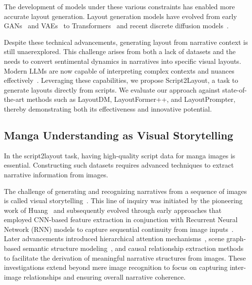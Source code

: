 \documentclass[sigconf, screen, review, anonymous]{acmart}
\begin{document}
The development of models under these various constraints has enabled more accurate layout generation.
Layout generation models have evolved from early GANs~\cite{li_layoutgan_2019} and VAEs~\cite{arroyo_variational_2021, jyothi2021layoutvaestochasticscenelayout} to Transformers~\cite{jiang_layoutformer_2023} and recent discrete diffusion models~\cite{inoue2023layoutdm, zhang_layoutdiffusion_2023}.

Despite these technical advancements, generating layout from narrative context is still unaerexplored. This challenge arises from both a lack of datasets and the needs to convert sentimental dynamics in narratives into specific visual layouts. Modern LLMs are now capable of interpreting complex contexts and nuances effectively~\cite{LLMunderstandingNarrative}. 
Leveraging these capabilities, we propose Script2Layout, a task to generate layouts directly from scripts. We evaluate our approach against state-of-the-art methods such as LayoutDM\cite{inoue2023layoutdm}, LayoutFormer++\cite{jiang_layoutformer_2023}, and LayoutPrompter\cite{lin_layoutprompter_2023}, thereby demonstrating both its effectiveness and innovative potential.

\subsection{Manga Understanding as Visual Storytelling}
In the script2layout task, having high-quality script data for manga images is essential.
Constructing such datasets requires advanced techniques to extract narrative information from images.

The challenge of generating and recognizing narratives from a sequence of images is called visual storytelling~\cite{huang_visual_2016}. This line of inquiry was initiated by the pioneering work of Huang~\cite{huang_visual_2016} and subsequently evolved through early approaches that employed CNN-based feature extraction in conjunction with Recurrent Neural Network (RNN) models to capture sequential continuity from image inputs~\cite{yu2017hierarchicallyattentivernnalbumsummarization}. Later advancements introduced hierarchical attention mechanisms~\cite{nahian_hierarchical_2019}, scene graph-based semantic structure modeling~\cite{wang_storytelling_scenegraphs2020}, and causal relationship extraction methods~\cite{song2024causalstorylocalcausalattention} to facilitate the derivation of meaningful narrative structures from images. These investigations extend beyond mere image recognition to focus on capturing inter-image relationships and ensuring overall narrative coherence.
\end{document}

